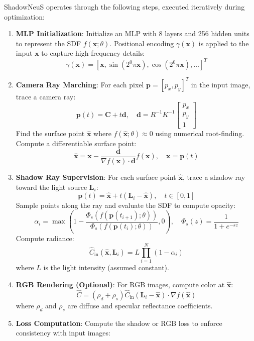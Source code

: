 \documentclass[12pt]{article}
\newcommand{\vect}[1]{\bm{#1}}
\theoremstyle{definition}
\begin{document}
ShadowNeuS operates through the following steps, executed iteratively during optimization:

\begin{enumerate}[label=\arabic*.]
    \item \textbf{MLP Initialization}: Initialize an MLP with 8 layers and 256 hidden units to represent the SDF \(f(\mathbf{x}; \theta)\). Positional encoding \(\gamma(\mathbf{x})\) is applied to the input \(\mathbf{x}\) to capture high-frequency details:
        \[
        \gamma(\mathbf{x}) = [\mathbf{x}, \sin(2^0 \pi \mathbf{x}), \cos(2^0 \pi \mathbf{x}), \dots]^T
        \]
    \item \textbf{Camera Ray Marching}: For each pixel \(\vect{p} = [p_x, p_y]^T\) in the input image, trace a camera ray:
        \[
        \mathbf{p}(t) = \mathbf{C} + t \mathbf{d}, \quad \mathbf{d} = R^{-1} K^{-1} \begin{bmatrix} p_x \\ p_y \\ 1 \end{bmatrix}
        \]
        Find the surface point \(\hat{\mathbf{x}}\) where \(f(\hat{\mathbf{x}}; \theta) \approx 0\) using numerical root-finding. Compute a differentiable surface point:
        \[
        \hat{\mathbf{x}} = \mathbf{x} - \frac{\mathbf{d}}{\nabla f(\mathbf{x}) \cdot \mathbf{d}} f(\mathbf{x}), \quad \mathbf{x} = \mathbf{p}(t)
        \]
    \item \textbf{Shadow Ray Supervision}: For each surface point \(\hat{\mathbf{x}}\), trace a shadow ray toward the light source \(\mathbf{L}_i\):
        \[
        \mathbf{p}(t) = \hat{\mathbf{x}} + t (\mathbf{L}_i - \hat{\mathbf{x}}), \quad t \in [0,1]
        \]
        Sample points along the ray and evaluate the SDF to compute opacity:
        \[
        \alpha_i = \max \left( 1 - \frac{\Phi_s(f(\mathbf{p}(t_{i+1}); \theta))}{\Phi_s(f(\mathbf{p}(t_i); \theta))}, 0 \right), \quad \Phi_s(z) = \frac{1}{1 + e^{-sz}}
        \]
        Compute radiance:
        \[
        \hat{C}_{\text{in}}(\hat{\mathbf{x}}, \mathbf{L}_i) = L \prod_{i=1}^N (1 - \alpha_i)
        \]
        where \(L\) is the light intensity (assumed constant).
    \item \textbf{RGB Rendering (Optional)}: For RGB images, compute color at \(\hat{\mathbf{x}}\):
        \[
        \hat{C} = (\rho_d + \rho_s) \hat{C}_{\text{in}} (\mathbf{L}_i - \hat{\mathbf{x}}) \cdot \nabla f(\hat{\mathbf{x}})
        \]
        where \(\rho_d\) and \(\rho_s\) are diffuse and specular reflectance coefficients.
    \item \textbf{Loss Computation}: Compute the shadow or RGB loss to enforce consistency with input images:

\end{enumerate}
\end{document}
